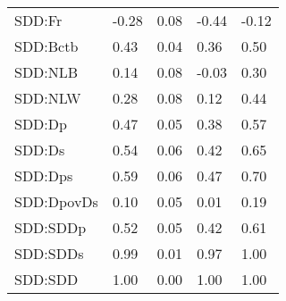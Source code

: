 \begin{center}
\begin{longtable}{|p{0.9in}|p{0.7in}|p{0.7in}|p{0.7in}|p{0.7in}|}
  SDD:Fr & -0.28 & 0.08 & -0.44 & -0.12 \\ 
  SDD:Bctb & 0.43 & 0.04 & 0.36 & 0.50 \\ 
  SDD:NLB & 0.14 & 0.08 & -0.03 & 0.30 \\ 
  SDD:NLW & 0.28 & 0.08 & 0.12 & 0.44 \\ 
  SDD:Dp & 0.47 & 0.05 & 0.38 & 0.57 \\ 
  SDD:Ds & 0.54 & 0.06 & 0.42 & 0.65 \\ 
  SDD:Dps & 0.59 & 0.06 & 0.47 & 0.70 \\ 
  SDD:DpovDs & 0.10 & 0.05 & 0.01 & 0.19 \\ 
  SDD:SDDp & 0.52 & 0.05 & 0.42 & 0.61 \\ 
  SDD:SDDs & 0.99 & 0.01 & 0.97 & 1.00 \\ 
  SDD:SDD & 1.00 & 0.00 & 1.00 & 1.00 \\ 
   \hline

\end{longtable}
\end{center}
%

